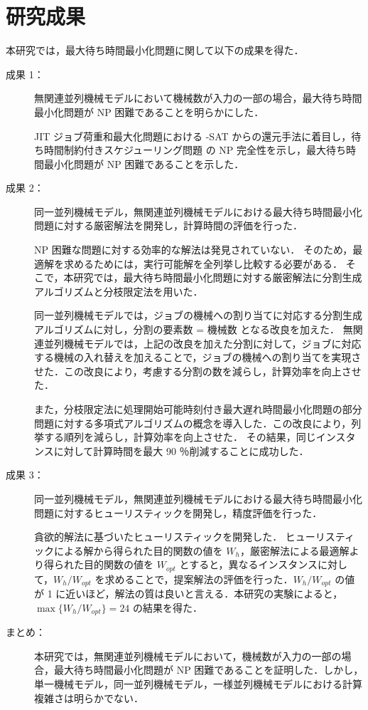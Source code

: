 \documentclass[12pt]{optlab-bachelor}
\begin{document}
\section{研究成果}
本研究では，最大待ち時間最小化問題に関して以下の成果を得た．
\begin{description}
  \item[成果 1：]
  無関連並列機械モデルにおいて機械数が入力の一部の場合，最大待ち時間最小化問題が NP 困難であることを明らかにした．

  JIT ジョブ荷重和最大化問題における {-SAT} からの還元手法に着目し，待ち時間制約付きスケジューリング問題 の NP 完全性を示し，最大待ち時間最小化問題が NP 困難であることを示した．

  \item[成果 2：]
  同一並列機械モデル，無関連並列機械モデルにおける最大待ち時間最小化問題に対する厳密解法を開発し，計算時間の評価を行った．

  NP 困難な問題に対する効率的な解法は発見されていない．
  そのため，最適解を求めるためには，実行可能解を全列挙し比較する必要がある．
  そこで，本研究では，最大待ち時間最小化問題に対する厳密解法に分割生成アルゴリズムと分枝限定法を用いた．

  同一並列機械モデルでは，ジョブの機械への割り当てに対応する分割生成アルゴリズムに対し，分割の要素数 = 機械数 となる改良を加えた．
  無関連並列機械モデルでは，上記の改良を加えた分割に対して，ジョブに対応する機械の入れ替えを加えることで，ジョブの機械への割り当てを実現させた．この改良により，考慮する分割の数を減らし，計算効率を向上させた．

  また，分枝限定法に処理開始可能時刻付き最大遅れ時間最小化問題の部分問題に対する多項式アルゴリズムの概念を導入した．この改良により，列挙する順列を減らし，計算効率を向上させた．
  その結果，同じインスタンスに対して計算時間を最大 90 ％削減することに成功した．

  \item[成果 3：]
  同一並列機械モデル，無関連並列機械モデルにおける最大待ち時間最小化問題に対するヒューリスティックを開発し，精度評価を行った．

  貪欲的解法に基づいたヒューリスティックを開発した．
  ヒューリスティックによる解から得られた目的関数の値を $W_h$，厳密解法による最適解より得られた目的関数の値を $W_{opt}$ とすると，異なるインスタンスに対して，$W_h/W_{opt}$ を求めることで，提案解法の評価を行った．$W_h/W_{opt}$ の値が 1 に近いほど，解法の質は良いと言える．本研究の実験によると，$\max\big\{W_h/W_{opt}\big\} = 24$ の結果を得た．

  \item[まとめ：] 本研究では，無関連並列機械モデルにおいて，機械数が入力の一部の場合，最大待ち時間最小化問題が NP 困難であることを証明した．しかし，単一機械モデル，同一並列機械モデル，一様並列機械モデルにおける計算複雑さは明らかでない．
\end{description}
\end{document}
